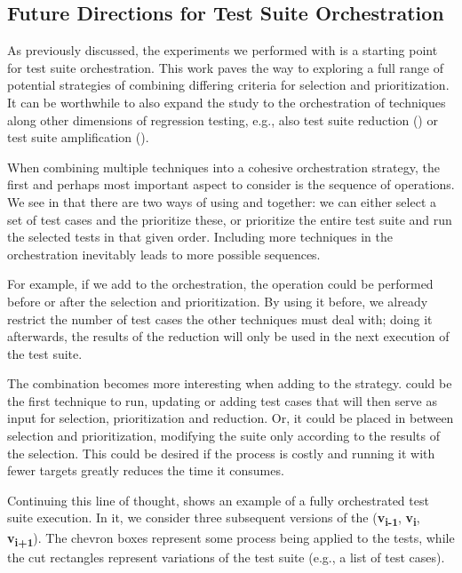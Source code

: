 \subsection{Future Directions for Test Suite Orchestration}

As previously discussed, the experiments we performed with \fz is a starting point for test suite orchestration.
This work paves the way to exploring a full range of potential strategies of combining differing criteria for selection and prioritization. 
It can be worthwhile to also expand the study to the orchestration of techniques along other dimensions of regression testing, e.g., also test suite reduction (\tsr) or test suite amplification (\tsa).

When combining multiple techniques into a cohesive orchestration strategy, the first and perhaps most important aspect to consider is the sequence of operations.
We see in  that there are two ways of using \tcs and \tcp together: we can either select a set of test cases and the prioritize these, or prioritize the entire test suite and run the selected tests in that given order.
Including more techniques in the orchestration inevitably leads to more possible sequences.

For example, if we add \tsr to the orchestration, the operation could be performed before or after the selection and prioritization.
By using it before, we already restrict the number of test cases the other techniques must deal with; doing it afterwards, the results of the reduction will only be used in the next execution of the test suite.

The combination becomes more interesting when adding \tsa to the strategy.
\tsa could be the first technique to run, updating or adding test cases that will then serve as input for selection, prioritization and reduction.
Or, it could be placed in between selection and prioritization, modifying the suite only according to the results of the selection.
This could be desired if the \tsa process is costly and running it with fewer targets greatly reduces the time it consumes.

Continuing this line of thought,  shows an example of a fully orchestrated test suite execution.
In it, we consider three subsequent versions of the \sut (\textbf{v\textsubscript{i-1}}, \textbf{v\textsubscript{i}}, \textbf{v\textsubscript{i+1}}).
The chevron boxes represent some process being applied to the tests, while the cut rectangles represent variations of the test suite (e.g., a list of test cases).

